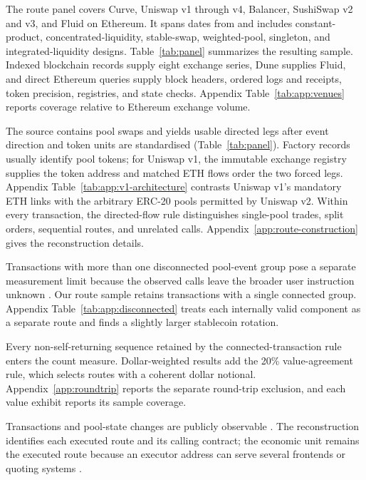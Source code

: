 The route panel covers Curve, Uniswap v1 through v4, Balancer, SushiSwap v2 and v3, and Fluid on Ethereum. It spans \RoutePanelCalendarDates{} dates from \RoutePanelSpan{} and includes constant-product, concentrated-liquidity, stable-swap, weighted-pool, singleton, and integrated-liquidity designs. Table~\ref{tab:panel} summarizes the resulting sample. Indexed blockchain records supply eight exchange series, Dune supplies Fluid, and direct Ethereum queries supply block headers, ordered logs and receipts, token precision, registries, and state checks. Appendix Table~\ref{tab:app:venues} reports coverage relative to Ethereum exchange volume.

The source contains \RoutePanelRawSwapsExact{} pool swaps and yields \RoutePanelUsableLegsExact{} usable directed legs after event direction and token units are standardised (Table~\ref{tab:panel}). Factory records usually identify pool tokens; for Uniswap v1, the immutable exchange registry supplies the token address and matched ETH flows order the two forced legs. Appendix Table~\ref{tab:app:v1-architecture} contrasts Uniswap v1's mandatory ETH links with the arbitrary ERC-20 pools permitted by Uniswap v2. Within every transaction, the directed-flow rule distinguishes single-pool trades, split orders, sequential routes, and unrelated calls. Appendix~\ref{app:route-construction} gives the reconstruction details.

Transactions with more than one disconnected pool-event group pose a separate measurement limit because the observed calls leave the broader user instruction unknown \citep{XiMoallemi2026Routing}. Our route sample retains transactions with a single connected group. Appendix Table~\ref{tab:app:disconnected} treats each internally valid component as a separate route and finds a slightly larger stablecoin rotation.

Every non-self-returning sequence retained by the connected-transaction rule enters the count measure. Dollar-weighted results add the 20\% value-agreement rule, which selects routes with a coherent dollar notional. Appendix~\ref{app:roundtrip} reports the separate round-trip exclusion, and each value exhibit reports its sample coverage.

Transactions and pool-state changes are publicly observable \citep{Schar2021DeFi}. The reconstruction identifies each executed route and its calling contract; the economic unit remains the executed route because an executor address can serve several frontends or quoting systems \citep{XiMoallemi2026Routing}.


